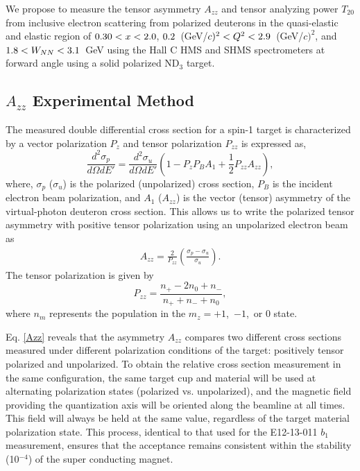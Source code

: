 We propose to measure the tensor asymmetry $A_{zz}$ and tensor analyzing power $T_{20}$ from inclusive electron scattering from polarized deuterons in the quasi-elastic and elastic region of $0.30<x<2.0$, $0.2$~(GeV/$c)^2 < Q^2 <2.9$~(GeV/$c)^2$, and $1.8 < W_{NN} < 3.1$~GeV using the Hall C HMS and SHMS spectrometers at forward angle using a solid polarized ND$_3$ target.


\subsection{$A_{zz}$ Experimental Method} %

The measured double differential cross section for a spin-1 target is characterized by a vector polarization $P_{z}$ and tensor polarization
$P_{zz}$ is expressed as,
\begin{equation}
\frac{d^2\sigma_p}{d\Omega dE'}=\frac{d^2\sigma_u}{d\Omega dE'}\left(1-P_zP_BA_1+\frac{1}{2}P_{zz}A_{zz}\right),
\label{eq:one}
\end{equation}
where, $\sigma_p$ ($\sigma_u$) is the polarized (unpolarized) cross section, $P_B$ is the incident electron beam polarization, and $A_1$ ($A_{zz}$) is the
vector (tensor) asymmetry of the virtual-photon deuteron cross section.  This allows us to write
the polarized tensor asymmetry with positive tensor polarization using an unpolarized electron beam as
\begin{eqnarray}
\label{Azz}
A_{zz} = \frac{2}{P_{zz}}\left(\frac{\sigma_p - \sigma_u}{\sigma_u}\right).
\end{eqnarray}
The tensor polarization is given by 
\begin{equation}
P_{zz}=\frac{n_+-2n_0+n_-}{n_++n_-+n_0},
\end{equation}
where $n_m$ represents the population in the $m_z=+1$,~$-1$,~or $0$ state.

Eq. \ref{Azz} reveals that the asymmetry $A_{zz}$ compares two different cross sections measured under different polarization conditions of the target: positively tensor polarized and unpolarized.  
To obtain the relative cross section measurement in the same configuration, the same target cup and material will be used at alternating polarization states (polarized vs. unpolarized),  and the magnetic field providing the quantization axis will be oriented along the beamline at all times.
This field will always be held at the same value, regardless of the target material polarization state. 
This process, identical to that used for the E12-13-011 $b_1$ measurement, ensures that the acceptance remains consistent within the stability (10$^{-4}$) of the super conducting magnet.  


